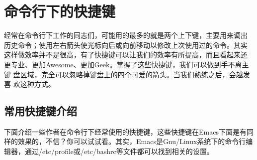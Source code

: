 \section{命令行下的快捷键}
\label{shortcut}

经常在命令行下工作的同志们，可能用的最多的就是两个上下键，主要用来调出
历史命令；使用左右箭头使光标向后或向前移动以修改上次使用过的命令。其实
这样做效率并不是很高，有了快捷键可以让我们的效率有所提高，而且看起来还
更专业、更加Awesome、更加Geek。掌握了这些快捷键，我们可以做到手不离主键
盘区域，完全可以忽略掉键盘上的四个可爱的箭头。当我们熟练之后，会越发喜
欢这种方式。

\subsection{常用快捷键介绍}

下面介绍一些作者在命令行下经常使用的快捷键，这些快捷键在Emacs下面是有同
样的效果的，不信？你可以试试看。其实，Emacs是Gnu/Linux系统下的命令行编
辑器，通过/etc/profile或/etc/bashrc等文件都可以找到相关的设置。

